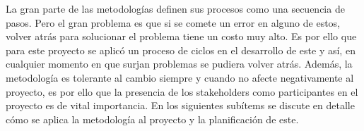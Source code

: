 La gran parte de las metodologías definen sus procesos como una secuencia de pasos. Pero el gran problema es que si se comete un error en alguno de estos, volver atrás para solucionar el problema tiene un costo muy alto. Es por ello que para este proyecto se aplicó un proceso de ciclos en el desarrollo de este y así, en cualquier momento en que surjan problemas se pudiera volver atrás. Además, la metodología es tolerante al cambio siempre y cuando no afecte negativamente al proyecto, es por ello que la presencia de los stakeholders como participantes en el proyecto es de vital importancia. En los siguientes subítems se discute en detalle cómo se aplica la metodología al proyecto y la planificación de este.